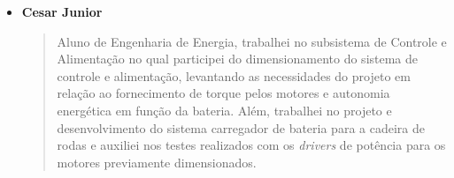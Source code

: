 \begin{itemize}
    \item \textbf{Cesar Junior}
    \begin{quote}
      Aluno de Engenharia de Energia, trabalhei no subsistema de Controle e 
      Alimentação no qual participei do dimensionamento do sistema 
      de controle e alimentação, levantando as necessidades do projeto em 
      relação ao fornecimento de torque pelos motores e autonomia energética 
      em função da bateria. Além, trabalhei no projeto e desenvolvimento do 
      sistema carregador de bateria para a cadeira de rodas e auxiliei nos 
      testes realizados com os \textit{drivers} de potência para os motores previamente 
      dimensionados.
    \end{quote}
\end{itemize}
